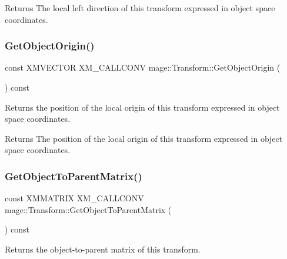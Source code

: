 \begin{DoxyReturn}{Returns}
The local left direction of this transform expressed in object space coordinates. 
\end{DoxyReturn}
\hypertarget{classmage_1_1_transform_ab0920e283e8f21d2ca766c2409993ee4}{}\label{classmage_1_1_transform_ab0920e283e8f21d2ca766c2409993ee4} 
\subsubsection{\texorpdfstring{Get\+Object\+Origin()}{GetObjectOrigin()}}
{\footnotesize\ttfamily const X\+M\+V\+E\+C\+T\+OR X\+M\+\_\+\+C\+A\+L\+L\+C\+O\+NV mage\+::\+Transform\+::\+Get\+Object\+Origin (\begin{DoxyParamCaption}{ }\end{DoxyParamCaption}) const\hspace{0.3cm}{\ttfamily [noexcept]}}

Returns the position of the local origin of this transform expressed in object space coordinates.

\begin{DoxyReturn}{Returns}
The position of the local origin of this transform expressed in object space coordinates. 
\end{DoxyReturn}
\hypertarget{classmage_1_1_transform_a9026a83f1441c9efefc7a67e005a833d}{}\label{classmage_1_1_transform_a9026a83f1441c9efefc7a67e005a833d} 
\subsubsection{\texorpdfstring{Get\+Object\+To\+Parent\+Matrix()}{GetObjectToParentMatrix()}}
{\footnotesize\ttfamily const X\+M\+M\+A\+T\+R\+IX X\+M\+\_\+\+C\+A\+L\+L\+C\+O\+NV mage\+::\+Transform\+::\+Get\+Object\+To\+Parent\+Matrix (\begin{DoxyParamCaption}{ }\end{DoxyParamCaption}) const\hspace{0.3cm}{\ttfamily [noexcept]}}

Returns the object-\/to-\/parent matrix of this transform.

